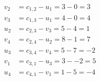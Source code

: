 \[
\begin{aligned}
v_{2} &= c_{1,2} - u_{1} = 3 - 0 = 3 \\
v_{3} &= c_{1,3} - u_{1} = 4 - 0 = 4 \\
u_{2} &= c_{2,3} - v_{3} = 5 - 4 = 1 \\
v_{4} &= c_{2,4} - u_{2} = 8 - 1 = 7 \\
u_{3} &= c_{3,4} - v_{4} = 5 - 7 = -2 \\
v_{1} &= c_{3,1} - u_{3} = 3 - -2 = 5 \\
u_{4} &= c_{4,1} - v_{1} = 1 - 5 = -4 \\
\end{aligned}
\]

